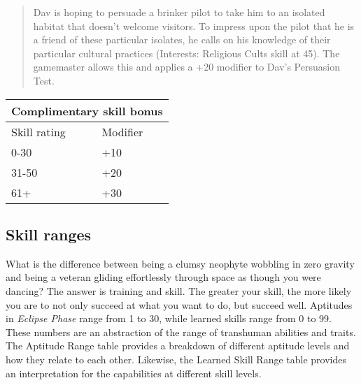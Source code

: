 \begin{quotation}
Dav is hoping to persuade a brinker pilot to take him to an isolated habitat that doesn’t welcome visitors. To impress upon the pilot that he is a friend of these particular isolates, he calls on his knowledge of their particular cultural practices (Interests: Religious Cults skill at 45). The gamemaster allows this and applies a +20 modifier to Dav’s Persuasion Test.
\end{quotation}

\begin{tabular}{|l|l|}
\hline
\multicolumn{2}{|c|}{Complimentary skill bonus} \\
\hline
Skill rating & Modifier \\
\hline
0-30		& +10 \\
31-50	& +20 \\
61+		& +30 \\
\hline
\end{tabular}


\subsection{Skill ranges}
\label{sec:skills:skill-ranges}

What is the difference between being a clumsy neophyte
wobbling in zero gravity and being a veteran
gliding effortlessly through space as though you were
dancing? The answer is training and skill. The greater
your skill, the more likely you are to not only succeed
at what you want to do, but succeed well.
Aptitudes in \emph{Eclipse Phase} range from 1 to 30,
while learned skills range from 0 to 99. These numbers
are an abstraction of the range of transhuman
abilities and traits. The Aptitude Range table provides
a breakdown of different aptitude levels and how they
relate to each other. Likewise, the Learned Skill Range
table provides an interpretation for the capabilities at
different skill levels.

